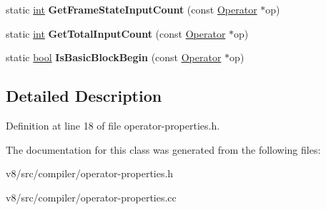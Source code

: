 \begin{DoxyCompactItemize}
static \mbox{\hyperlink{classint}{int}} {\bfseries Get\+Frame\+State\+Input\+Count} (const \mbox{\hyperlink{classv8_1_1internal_1_1compiler_1_1Operator}{Operator}} $\ast$op)
\item 
\mbox{\label{classv8_1_1internal_1_1compiler_1_1OperatorProperties_a042c21e4fd4504a108aec865df6a99d3}} 
static \mbox{\hyperlink{classint}{int}} {\bfseries Get\+Total\+Input\+Count} (const \mbox{\hyperlink{classv8_1_1internal_1_1compiler_1_1Operator}{Operator}} $\ast$op)
\item 
\mbox{\label{classv8_1_1internal_1_1compiler_1_1OperatorProperties_a7b8dbf4be8dee6901ecc82f932814a31}} 
static \mbox{\hyperlink{classbool}{bool}} {\bfseries Is\+Basic\+Block\+Begin} (const \mbox{\hyperlink{classv8_1_1internal_1_1compiler_1_1Operator}{Operator}} $\ast$op)
\end{DoxyCompactItemize}


\subsection{Detailed Description}


Definition at line 18 of file operator-\/properties.\+h.



The documentation for this class was generated from the following files\+:\begin{DoxyCompactItemize}
\item 
v8/src/compiler/operator-\/properties.\+h\item 
v8/src/compiler/operator-\/properties.\+cc\end{DoxyCompactItemize}
